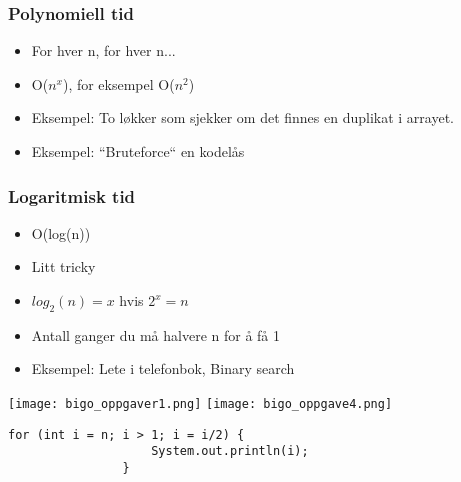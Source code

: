 \documentclass[norsk]{beamer}
\begin{document}
    \begin{frame}
        \frametitle{Polynomiell tid}

        \begin{itemize}
            \item For hver n, for hver n...
            \item O($n^x$), for eksempel O($n^2$)
            \item Eksempel: To løkker som sjekker om det finnes en duplikat i arrayet.
            \item Eksempel: ``Bruteforce`` en kodelås
        \end{itemize}
    \end{frame}

    \begin{frame}
        \frametitle{Logaritmisk tid}

        \begin{itemize}
            \item O(log(n))
            \item Litt tricky
            \item $log_2(n) = x$ hvis $2^x = n$
            \item Antall ganger du må halvere n for å få 1
            \item Eksempel: Lete i telefonbok, Binary search
        \end{itemize}
    \end{frame}

    \begin{frame}[fragile]
        \begin{center}
            \texttt{[image: bigo\_oppgaver1.png]}
            \texttt{[image: bigo\_oppgave4.png]}

        \begin{lstlisting}[basicstyle=\scriptsize]
                for (int i = n; i > 1; i = i/2) {
                    System.out.println(i);
                }
		\end{lstlisting}
        \end{center}
    \end{frame}
\end{document}
